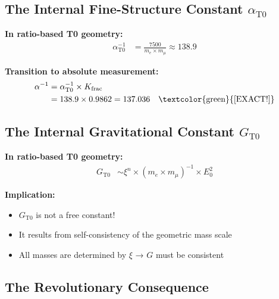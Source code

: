 	\subsection{The Internal Fine-Structure Constant $\alpha_{\text{T0}}$}
	
	\textbf{In ratio-based T0 geometry:}
	\begin{align*}
		\alpha_{\text{T0}}^{-1} &= \frac{7500}{m_e \times m_μ} \approx 138.9
	\end{align*}
	
	\textbf{Transition to absolute measurement:}
	\begin{align*}
		\alpha^{-1} &= \alpha_{\text{T0}}^{-1} \times K_{\text{frac}} \\
		&= 138.9 \times 0.9862 = 137.036 \quad \text{\textcolor{green}{[EXACT!]}}
	\end{align*}
	
	\subsection{The Internal Gravitational Constant $G_{\text{T0}}$}
	
	\textbf{In ratio-based T0 geometry:}
	\begin{align*}
		G_{\text{T0}} &\sim \xi^n \times (m_e \times m_μ)^{-1} \times E_0^2
	\end{align*}
	
	\textbf{Implication:}
	\begin{itemize}
		\item $G_{\text{T0}}$ is not a free constant!
		\item It results from self-consistency of the geometric mass scale
		\item All masses are determined by $\xi$ → $G$ must be consistent
	\end{itemize}
	
	\subsection{The Revolutionary Consequence}
	
	\begin{center}
	\end{center}
	
